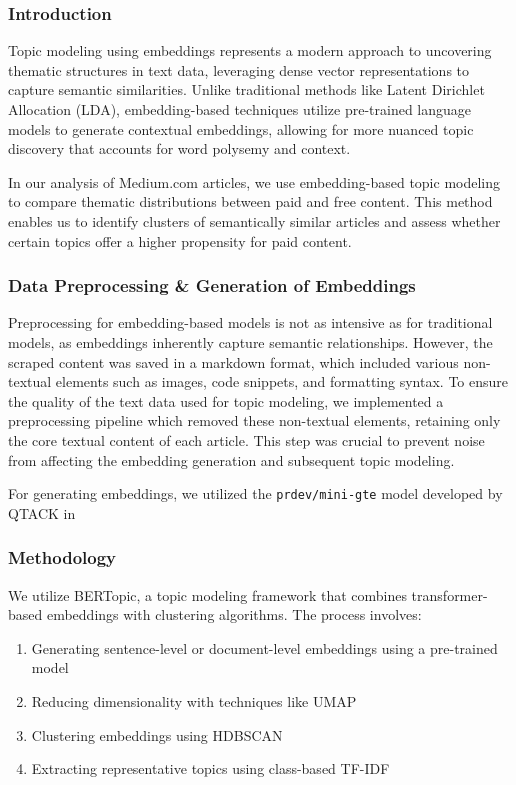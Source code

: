 \documentclass[11pt,a4paper]{article}
\newcommand{\code}[1]{\texttt{#1}}
\begin{document}
\subsubsection{Introduction}

Topic modeling using embeddings represents a modern approach to uncovering thematic structures in text data, leveraging dense vector representations to capture semantic similarities. Unlike traditional methods like Latent Dirichlet Allocation (LDA), embedding-based techniques utilize pre-trained language models to generate contextual embeddings, allowing for more nuanced topic discovery that accounts for word polysemy and context.

In our analysis of Medium.com articles, we use embedding-based topic modeling to compare thematic distributions between paid and free content. This method enables us to identify clusters of semantically similar articles and assess whether certain topics offer a higher propensity for paid content.

\subsubsection{Data Preprocessing \& Generation of Embeddings}

Preprocessing for embedding-based models is not as intensive as for traditional models, as embeddings inherently capture semantic relationships. However, the scraped content was saved in a markdown format, which included various non-textual elements such as images, code snippets, and formatting syntax. To ensure the quality of the text data used for topic modeling, we implemented a preprocessing pipeline which removed these non-textual elements, retaining only the core textual content of each article. This step was crucial to prevent noise from affecting the embedding generation and subsequent topic modeling.

For generating embeddings, we utilized the \code{prdev/mini-gte} model developed by QTACK \cite{minigte} in 

\subsubsection{Methodology}

We utilize BERTopic, a topic modeling framework that combines transformer-based embeddings with clustering algorithms. The process involves:
\begin{enumerate}
    \item Generating sentence-level or document-level embeddings using a pre-trained model
    \item Reducing dimensionality with techniques like UMAP
    \item Clustering embeddings using HDBSCAN
    \item Extracting representative topics using class-based TF-IDF
\end{enumerate}
\end{document}
